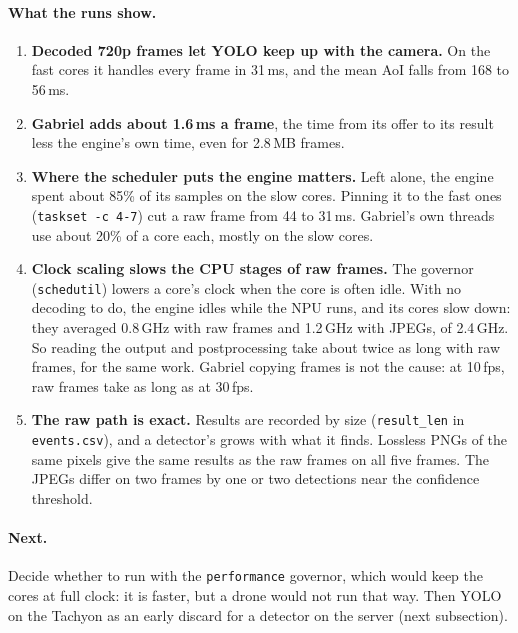 \documentclass[11pt]{article}
\newcommand{\code}[1]{\texttt{#1}}
\begin{document}
\paragraph{What the runs show.}
\begin{enumerate}[nosep]
  \item \textbf{Decoded 720p frames let YOLO keep up with the camera.} On the
        fast cores it handles every frame in 31\,ms, and the mean AoI falls
        from 168 to 56\,ms.
  \item \textbf{Gabriel adds about 1.6\,ms a frame}, the time from its offer
        to its result less the engine's own time, even for 2.8\,MB frames.
  \item \textbf{Where the scheduler puts the engine matters.} Left alone, the
        engine spent about 85\% of its samples on the slow cores. Pinning it to the
        fast ones (\code{taskset -c 4-7}) cut a raw frame from 44 to 31\,ms.
        Gabriel's own threads use about 20\% of a core each, mostly on the
        slow cores.
  \item \textbf{Clock scaling slows the CPU stages of raw frames.} The
        governor (\code{schedutil}) lowers a core's clock when the core is
        often idle. With no decoding to do, the engine idles while the NPU
        runs, and its cores slow down: they averaged 0.8\,GHz with raw
        frames and 1.2\,GHz with JPEGs, of 2.4\,GHz. So reading the output
        and postprocessing take about twice as long with raw frames, for the
        same work. Gabriel copying frames is not the cause: at 10\,fps, raw
        frames take as long as at 30\,fps.
  \item \textbf{The raw path is exact.} Results are recorded by size
        (\code{result\_len} in \code{events.csv}), and a detector's grows
        with what it finds. Lossless PNGs of the same pixels give the same
        results as the raw frames on all five frames. The JPEGs differ on
        two frames by one or two detections near the confidence threshold.
\end{enumerate}

\paragraph{Next.} Decide whether to run with the \code{performance}
governor, which would keep the cores at full clock: it is faster, but a
drone would not run that way. Then YOLO on the Tachyon as an early discard
for a detector on the server (next subsection).
\end{document}
